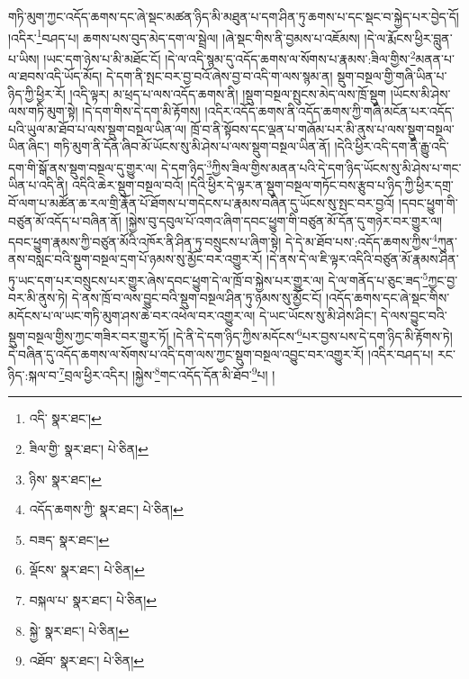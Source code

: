 གཏི་མུག་ཀྱང་འདོད་ཆགས་དང་ཞེ་སྡང་མཚན་ཉིད་མི་མཐུན་པ་དག་ཤིན་ཏུ་ཆགས་པ་དང་སྡང་བ་སྐྱེད་པར་བྱེད་དོ། །འདིར་\footnote{འདི་  སྣར་ཐང་། }བཤད་པ། ཆགས་པས་བུད་མེད་དག་ལ་སྦྲེལ། །ཞེ་སྡང་གིས་ནི་བྱམས་པ་འཇོམས། །དེ་ལ་རྨོངས་ཕྱིར་བླུན་པ་ཡིས། །ཡང་དག་ཉེས་པ་མི་མཐོང་ངོ། །དེ་ལ་འདི་སྙམ་དུ་འདོད་ཆགས་ལ་སོགས་པ་རྣམས་:ཟིལ་གྱིས་\footnote{ཟིལ་གྱི་  སྣར་ཐང་།  པེ་ཅིན། }མནན་པ་ལ་ཐབས་འདི་ཡོད་མོད། དེ་དག་ནི་སྤང་བར་བྱ་བའོ་ཞེས་བྱ་བ་འདི་ག་ལས་སྙམ་ན། སྡུག་བསྔལ་གྱི་གཞི་ཡིན་པ་ཉིད་ཀྱི་ཕྱིར་རོ། །འདི་ལྟར། མ་ཕྲད་པ་ལས་འདོད་ཆགས་ནི། །སྡུག་བསྔལ་སྤུངས་མེད་ལས་ཁྲོ་སྡུག །ཡོངས་མི་ཤེས་ལས་གཏི་མུག་སྟེ། །དེ་དག་གིས་དེ་དག་མི་རྟོགས། །འདིར་འདོད་ཆགས་ནི་འདོད་ཆགས་ཀྱི་གཞི་མངོན་པར་འདོད་པའི་ཡུལ་མ་ཐོབ་པ་ལས་སྡུག་བསྔལ་ཡིན་ལ། ཁྲོ་བ་ནི་སྟོབས་དང་ལྡན་པ་གཞོམ་པར་མི་ནུས་པ་ལས་སྡུག་བསྔལ་ཡིན་ཞིང་། གཏི་མུག་ནི་དོན་ཞིབ་མོ་ཡོངས་སུ་མི་ཤེས་པ་ལས་སྡུག་བསྔལ་ཡིན་ནོ། །དེའི་ཕྱིར་འདི་དག་ནི་རྒྱུ་འདི་དག་གི་སྒོ་ནས་སྡུག་བསྔལ་དུ་གྱུར་ལ། དེ་དག་ཉིད་\footnote{ཉིས་  སྣར་ཐང་། }ཀྱིས་ཟིལ་གྱིས་མནན་པའི་དེ་དག་ཉིད་ཡོངས་སུ་མི་ཤེས་པ་གང་ཡིན་པ་འདི་ནི། འདིའི་ཆེར་སྡུག་བསྔལ་བའོ། །དེའི་ཕྱིར་དེ་ལྟར་ན་སྡུག་བསྔལ་གཏོང་བས་རྩུབ་པ་ཉིད་ཀྱི་ཕྱིར་དགྲ་བོ་ལག་པ་མཚོན་ཆ་རལ་གྲི་རྣོན་པོ་ཐོགས་པ་གདེངས་པ་རྣམས་བཞིན་དུ་ཡོངས་སུ་སྤང་བར་བྱའོ། །དབང་ཕྱུག་གི་བཙུན་མོ་འདོད་པ་བཞིན་ནོ། །སྐྱེས་བུ་དབུལ་པོ་འགའ་ཞིག་དབང་ཕྱུག་གི་བཙུན་མོ་དོན་དུ་གཉེར་བར་གྱུར་ལ། དབང་ཕྱུག་རྣམས་ཀྱི་བཙུན་མོའི་འཁོར་ནི་ཤིན་ཏུ་བསྲུངས་པ་ཞིག་སྟེ། དེ་དེ་མ་ཐོབ་པས་:འདོད་ཆགས་ཀྱིས་\footnote{འདོད་ཆགས་ཀྱི་  སྣར་ཐང་།  པེ་ཅིན། }ཀུན་ནས་བསླང་བའི་སྡུག་བསྔལ་དྲག་པོ་ཉམས་སུ་མྱོང་བར་འགྱུར་རོ། །དེ་ནས་དེ་ལ་ཇི་ལྟར་འདིའི་བཙུན་མོ་རྣམས་ཤིན་ཏུ་ཡང་དག་པར་བསྲུངས་པར་གྱུར་ཞེས་དབང་ཕྱུག་དེ་ལ་ཁྲོ་བ་སྐྱེས་པར་གྱུར་ལ། དེ་ལ་གནོད་པ་ཅུང་ཟད་\footnote{བཟད་  སྣར་ཐང་། }ཀྱང་བྱ་བར་མི་ནུས་ཏེ། དེ་ནས་ཁྲོ་བ་ལས་བྱུང་བའི་སྡུག་བསྔལ་ཤིན་ཏུ་ཉམས་སུ་མྱོང་ངོ། །འདོད་ཆགས་དང་ཞེ་སྡང་གིས་མདོངས་པ་ལ་ཡང་གཏི་མུག་ཤས་ཆེ་བར་འཕེལ་བར་འགྱུར་ལ། དེ་ཡང་ཡོངས་སུ་མི་ཤེས་ཤིང་། དེ་ལས་བྱུང་བའི་སྡུག་བསྔལ་གྱིས་ཀྱང་གཟིར་བར་གྱུར་ཏོ། །དེ་ནི་དེ་དག་ཉིད་ཀྱིས་མདོངས་\footnote{ལྡོངས་  སྣར་ཐང་།  པེ་ཅིན། }པར་བྱས་པས་དེ་དག་ཉིད་མི་རྟོགས་ཏེ། དེ་བཞིན་དུ་འདོད་ཆགས་ལ་སོགས་པ་འདི་དག་ལས་ཀྱང་སྡུག་བསྔལ་འབྱུང་བར་འགྱུར་རོ། །འདིར་བཤད་པ། རང་ཉིད་:སྐལ་བ་\footnote{བསྐལ་པ་  སྣར་ཐང་།  པེ་ཅིན། }བྲལ་ཕྱིར་འདིར། །སྐྱེས་\footnote{སྐྱེ་  སྣར་ཐང་།  པེ་ཅིན། }གང་འདོད་དོན་མི་ཐོབ་\footnote{འཐོབ་  སྣར་ཐང་།  པེ་ཅིན། }པ། །
